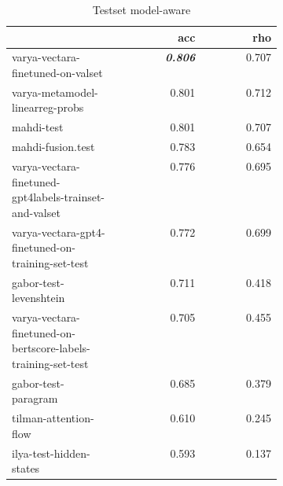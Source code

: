\begin{table}
\centering
\caption{Testset model-aware}
\label{test-aware}
\begin{tabular}{|p{0.4\linewidth}|r|r|}
\hline
 & acc & rho \\
\hline
varya-vectara-finetuned-on-valset & \textit{\textbf{0.806}} & 0.707 \\
\cline{1-3}
varya-metamodel-linearreg-probs & 0.801 & 0.712 \\
\cline{1-3}
mahdi-test & 0.801 & 0.707 \\
\cline{1-3}
mahdi-fusion.test & 0.783 & 0.654 \\
\cline{1-3}
varya-vectara-finetuned-gpt4labels-trainset-and-valset & 0.776 & 0.695 \\
\cline{1-3}
varya-vectara-gpt4-finetuned-on-training-set-test & 0.772 & 0.699 \\
\cline{1-3}
gabor-test-levenshtein & 0.711 & 0.418 \\
\cline{1-3}
varya-vectara-finetuned-on-bertscore-labels-training-set-test & 0.705 & 0.455 \\
\cline{1-3}
gabor-test-paragram & 0.685 & 0.379 \\
\cline{1-3}
tilman-attention-flow & 0.610 & 0.245 \\
\cline{1-3}
ilya-test-hidden-states & 0.593 & 0.137 \\
\cline{1-3}
\hline
\end{tabular}
\end{table}
